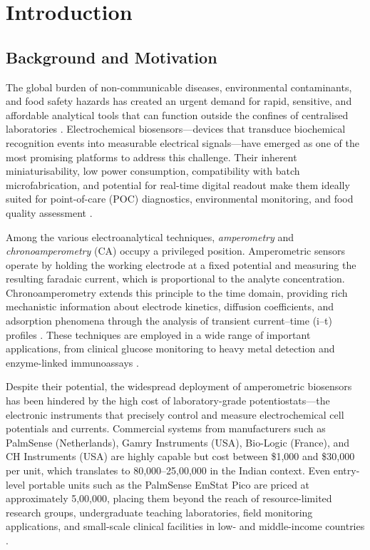 \chapter{Introduction}
\label{ch:intro}

\section{Background and Motivation}
\label{sec:background}

The global burden of non-communicable diseases, environmental contaminants, and food safety hazards has created an urgent demand for rapid, sensitive, and affordable analytical tools that can function outside the confines of centralised laboratories \cite{Turner2013}. Electrochemical biosensors—devices that transduce biochemical recognition events into measurable electrical signals—have emerged as one of the most promising platforms to address this challenge. Their inherent miniaturisability, low power consumption, compatibility with batch microfabrication, and potential for real-time digital readout make them ideally suited for point-of-care (POC) diagnostics, environmental monitoring, and food quality assessment \cite{Drummond2003, Kimmel2012}.

Among the various electroanalytical techniques, \textit{amperometry} and \textit{chronoamperometry} (CA) occupy a privileged position. Amperometric sensors operate by holding the working electrode at a fixed potential and measuring the resulting faradaic current, which is proportional to the analyte concentration. Chronoamperometry extends this principle to the time domain, providing rich mechanistic information about electrode kinetics, diffusion coefficients, and adsorption phenomena through the analysis of transient current–time (i–t) profiles \cite{Bard2001}. These techniques are employed in a wide range of important applications, from clinical glucose monitoring to heavy metal detection and enzyme-linked immunoassays \cite{Wang2006, Thevenot2001}.

Despite their potential, the widespread deployment of amperometric biosensors has been hindered by the high cost of laboratory-grade potentiostats---the electronic instruments that precisely control and measure electrochemical cell potentials and currents. Commercial systems from manufacturers such as PalmSense (Netherlands), Gamry Instruments (USA), Bio-Logic (France), and CH Instruments (USA) are highly capable but cost between \$1,000 and \$30,000 per unit, which translates to \texttildelow\rupee{}80,000--\rupee{}25,00,000 in the Indian context. Even entry-level portable units such as the PalmSense EmStat Pico are priced at approximately \texttildelow\rupee{}5,00,000, placing them beyond the reach of resource-limited research groups, undergraduate teaching laboratories, field monitoring applications, and small-scale clinical facilities in low- and middle-income countries \cite{Ainla2018, Rowe2011}.

